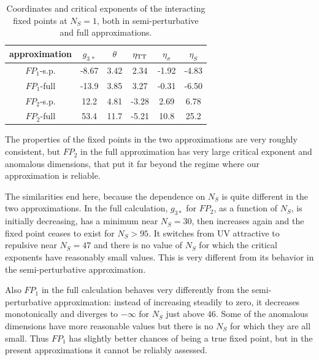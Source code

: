 \documentclass[11pt]{book} %
\begin{document}
\begin{table}[!here]
\begin{tabular}{cccccc}
approximation&$g_{3\,\ast}$& $\theta$& $\eta_{\rm TT}$&$\eta_{\sigma}$& $\eta_S$\\ \hline \hline
$FP_1$-s.p. & -8.67 & 3.42 & 2.34 &-1.92 &-4.83 \\ \hline
$FP_1$-full & -13.9 & 3.85 & 3.27 &-0.31 &-6.50 \\ \hline
$FP_2$-s.p. & 12.2 & 4.81 & -3.28 & 2.69 & 6.78 \\ \hline
$FP_2$-full & 53.4 & 11.7 & -5.21 &10.8 &25.2\\ \hline\hline
\end{tabular}
\caption{\label{FPtab3}Coordinates and critical exponents of the interacting fixed points at $N_S=1$, both in semi-perturbative and full approximations.}
\end{table}


The properties of the fixed points in the two approximations
are very roughly consistent, but $FP_2$ in the full approximation
has very large critical exponent and anomalous dimensions,
that put it far beyond the regime where our approximation is reliable.


The similarities end here, because the dependence on $N_S$
is quite different in the two approximations.
In the full calculation, $g_{3*}$ for $FP_2$,
as a function of $N_S$, is initially decreasing,
has a minimum near $N_S=30$,
then increases again and the fixed point
ceases to exist for $N_S>95$.
It switches from UV attractive to repulsive near $N_S=47$
and there is no value of $N_S$ for which the critical exponents
have reasonably small values.
This is very different from its behavior in the semi-perturbative
approximation.

Also $FP_1$ in the full calculation behaves very differently from
the semi-perturbative approximation:
instead of increasing steadily to zero, it decreases monotonically
and diverges to $-\infty$ for $N_S$ just above $46$.
Some of the anomalous dimensions have more reasonable values
but there is no $N_S$ for which they are all small.
Thus $FP_1$ has slightly better chances of being
a true fixed point, but in the present approximations
it cannot be reliably assessed.
\end{document}
